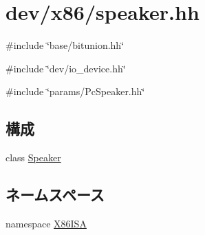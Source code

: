 \hypertarget{speaker_8hh}{
\section{dev/x86/speaker.hh}
\label{speaker_8hh}
}
{\ttfamily \#include \char`\"{}base/bitunion.hh\char`\"{}}\par
{\ttfamily \#include \char`\"{}dev/io\_\-device.hh\char`\"{}}\par
{\ttfamily \#include \char`\"{}params/PcSpeaker.hh\char`\"{}}\par
\subsection*{構成}
\begin{DoxyCompactItemize}
\item 
class \hyperlink{classX86ISA_1_1Speaker}{Speaker}
\end{DoxyCompactItemize}
\subsection*{ネームスペース}
\begin{DoxyCompactItemize}
\item 
namespace \hyperlink{namespaceX86ISA}{X86ISA}
\end{DoxyCompactItemize}
